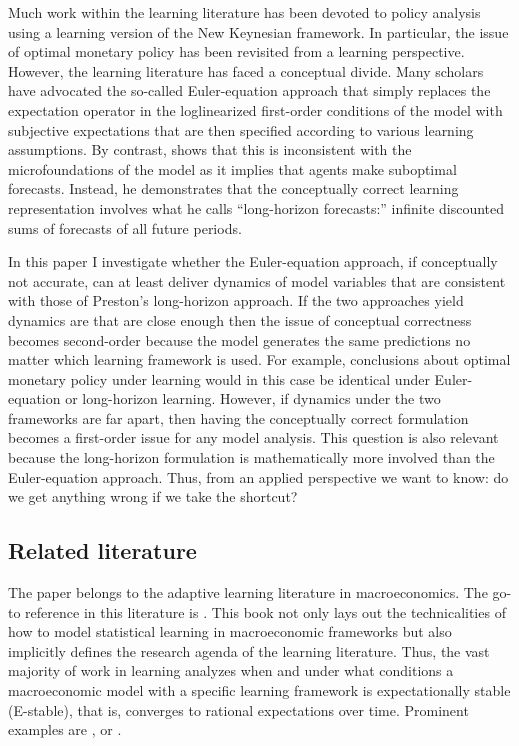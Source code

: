 \documentclass[11pt]{article}
\renewcommand{\[}{\begin{equation}}
\renewcommand{\]}{\end{equation}}
\begin{document}
Much work within the learning literature has been devoted to policy analysis using a learning version of the New Keynesian framework. In particular, the issue of optimal monetary policy has been revisited from a learning perspective. However, the learning literature has faced a conceptual divide. Many scholars have advocated the so-called Euler-equation approach that simply replaces the expectation operator in the loglinearized first-order conditions of the model with subjective expectations that are then specified according to various learning assumptions. By contrast, \cite{preston2005} shows that this is inconsistent with the microfoundations of the model as it implies that agents make suboptimal forecasts. Instead, he demonstrates that the conceptually correct learning representation involves what he calls ``long-horizon forecasts:'' infinite discounted sums of forecasts of all future periods. 

In this paper I investigate whether the Euler-equation approach, if conceptually not accurate, can at least deliver dynamics of model variables that are consistent with those of Preston's long-horizon approach. If the two approaches yield dynamics are that are close enough then the issue of conceptual correctness becomes second-order because the model generates the same predictions no matter which learning framework is used. For example, conclusions about optimal monetary policy under learning would in this case be identical under Euler-equation or long-horizon learning. However, if dynamics under the two frameworks are far apart, then having the conceptually correct formulation becomes a first-order issue for any model analysis. This question is also relevant because the long-horizon formulation is mathematically more involved than the Euler-equation approach. Thus, from an applied perspective we want to know: do we get anything wrong if we take the shortcut?

\subsection{Related literature}
The paper belongs to the adaptive learning literature in macroeconomics. The go-to reference in this literature is \cite{evans_honkapohja2001}. This book not only lays out the technicalities of how to model statistical learning in macroeconomic frameworks but also implicitly defines the research agenda of the learning literature. Thus, the vast majority of work in learning analyzes when and under what conditions a macroeconomic model with a specific learning framework is expectationally stable (E-stable), that is, converges to rational expectations over time. Prominent examples are \cite{evans2003expectations}, \cite{marcet1989convergence} or \cite{eusepi2018science}. 
\end{document}
